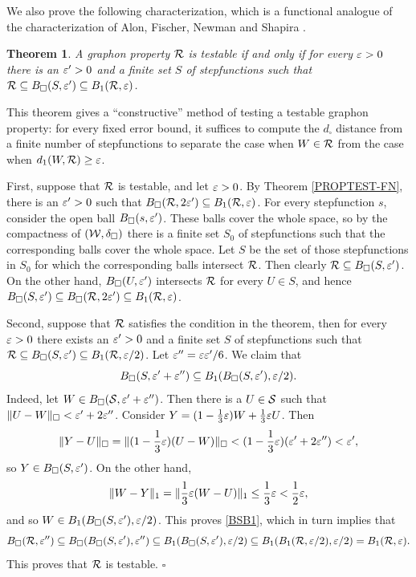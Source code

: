 \documentclass{article}
\newtheorem{theorem}{Theorem}[section]
\newenvironment{proof}{\medskip\noindent{\bf Proof. }}{\hfill$\square$\medskip}
\begin{document}
We also prove the following characterization, which is a functional
analogue of the characterization of Alon, Fischer, Newman and Shapira
\cite{AFNS}.

\begin{theorem}\label{REG-TEST}
A graphon property $\mathcal{R}$ is testable if and only if for every
$\varepsilon>0$ there is an $\varepsilon'>0$ and a finite set $S$ of stepfunctions
such that $\mathcal{R}\subseteq B_\square(S,\varepsilon')\subseteq B_1(\mathcal{R},\varepsilon)$.
\end{theorem}

This theorem gives a ``constructive'' method of testing a testable
graphon property: for every fixed error bound, it suffices to compute
the $d_\square$ distance from a finite number of stepfunctions to
separate the case when $W\in\mathcal{R}$ from the case when $d_1(W,\mathcal{R})\ge
\varepsilon$.

\begin{proof}
First, suppose that $\mathcal{R}$ is testable, and let $\varepsilon>0$. By Theorem
\ref{PROPTEST-FN}, there is an $\varepsilon'>0$ such that
$B_\square(\mathcal{R},2\varepsilon')\subseteq B_1(\mathcal{R},\varepsilon)$. For every
stepfunction $s$, consider the open ball $B_\square(s,\varepsilon')$. These
balls cover the whole space, so by the compactness of
$(\mathcal{W},\delta_\square)$ there is a finite set $S_0$ of stepfunctions
such that the corresponding balls cover the whole space. Let $S$ be
the set of those stepfunctions in $S_0$ for which the corresponding
balls intersect $\mathcal{R}$. Then clearly $\mathcal{R}\subseteq
B_\square(S,\varepsilon')$. On the other hand, $B_\square(U,\varepsilon')$
intersects $\mathcal{R}$ for every $U\in S$, and hence
$B_\square(S,\varepsilon')\subseteq B_\square(\mathcal{R},2\varepsilon')\subseteq
B_1(\mathcal{R},\varepsilon)$.

Second, suppose that $\mathcal{R}$ satisfies the condition in the theorem,
then for every $\varepsilon>0$ there exists an $\varepsilon'>0$ and a finite set
$S$ of stepfunctions such that $\mathcal{R}\subseteq
B_\square(S,\varepsilon')\subseteq B_1(\mathcal{R},\varepsilon/2)$. Let
$\varepsilon''=\varepsilon\varepsilon'/6$. We claim that
\begin{equation}\label{BSB1}
B_\square(S,\varepsilon'+\varepsilon'')\subseteq B_1(B_\square(S,\varepsilon'),\varepsilon/2).
\end{equation}
Indeed, let $W\in B_\square(\mathcal{S},\varepsilon'+\varepsilon'')$. Then there is a $U\in
\mathcal{S}$ such that $\|U-W\|_\square<\varepsilon'+2\varepsilon''$. Consider
$Y=(1-\frac13\varepsilon)W+\frac13\varepsilon U$. Then
\[
\|Y-U\|_\square = \|(1-\frac13\varepsilon)(U-W)\|_\square <
(1-\frac13\varepsilon)(\varepsilon'+2\varepsilon'') < \varepsilon',
\]
so $Y\in B_\square(S,\varepsilon')$. On the other hand,
\[
\|W-Y\|_1 =\|\frac13\varepsilon(W-U)\|_1 \le\frac13\varepsilon<\frac12\varepsilon,
\]
and so $W\in B_1(B_\square(S,\varepsilon'),\varepsilon/2)$. This proves
\eqref{BSB1}, which in turn implies that
\[
B_\square(\mathcal{R},\varepsilon'')\subseteq
B_\square(B_\square(S,\varepsilon'),\varepsilon'')\subseteq
B_1(B_\square(S,\varepsilon'),\varepsilon/2)\subseteq B_1(B_1(\mathcal{R},\varepsilon/2),\varepsilon/2)=
B_1(\mathcal{R},\varepsilon).
\]
This proves that $\mathcal{R}$ is testable.
\end{proof}
\end{document}
